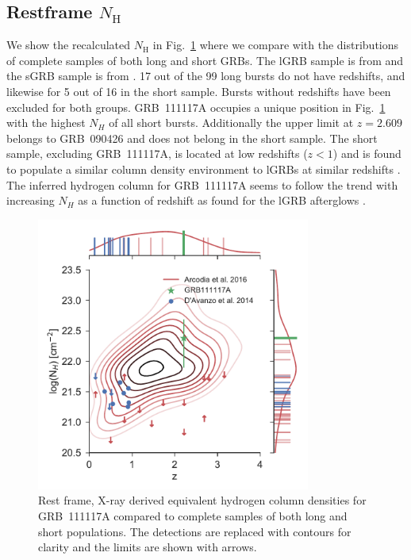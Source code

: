 \documentclass{aa}    %
\begin{document}
\subsection{Restframe $N_\mathrm{H}$} \label{restnH}

We show the recalculated $N_\mathrm{H}$ in Fig.~\ref{fig:NH_z} where we compare
with the distributions of complete samples of both long and short GRBs. The lGRB
sample is from \citet{Arcodia2016} and the sGRB sample is from
\citet{DAvanzo2014a}. 17 out of the 99 long bursts do not have redshifts, and
likewise for 5 out of 16 in the short sample. Bursts without redshifts have been
excluded for both groups. GRB~111117A occupies a unique position in
Fig.~\ref{fig:NH_z} with the highest $N_H$ of all short bursts. Additionally the
upper limit at $z = 2.609$ belongs to GRB~090426 and does not belong in the
short sample. The short sample, excluding GRB~111117A, is located at low
redshifts ($z < 1$) and is found to populate a similar column density
environment to lGRBs at similar redshifts \citep{DAvanzo2014a}. The inferred
hydrogen column for GRB~111117A seems to follow the trend with increasing $N_H$
as a function of redshift as found for the lGRB afterglows \citep{Arcodia2016}. 


\begin{figure}
	\centering
	\includegraphics[width=9cm]{figures/NH_z.pdf}
	\caption{Rest frame, X-ray derived equivalent hydrogen column densities for GRB~111117A compared to complete samples of both long and short populations. The detections are replaced with contours for clarity and the limits are shown with arrows.}
	\label{fig:NH_z}
\end{figure}
\end{document}
